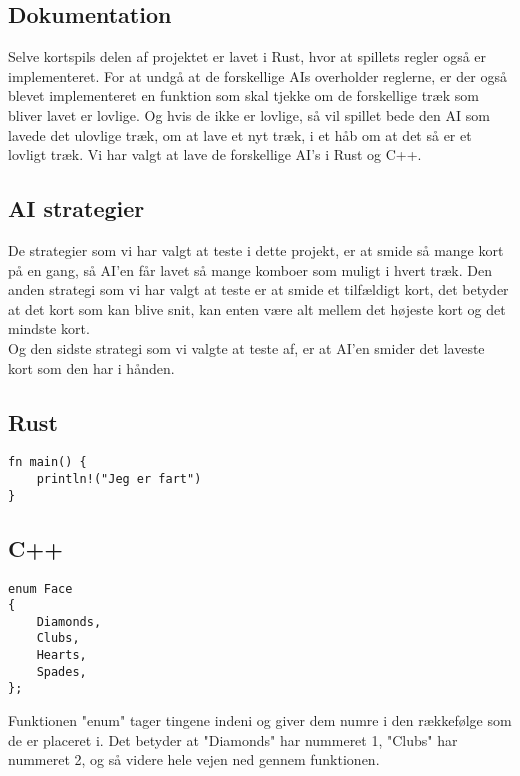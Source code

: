 \documentclass[a4paper, 12pt]{article}
\begin{document}
\begin{multicols}{2}
\vfill

\section{Dokumentation}

Selve kortspils delen af projektet er lavet i Rust, hvor at spillets regler også er implementeret. For at undgå at de forskellige AIs overholder reglerne, er der også blevet implementeret en funktion som skal tjekke om de forskellige træk som bliver lavet er lovlige. Og hvis de ikke er lovlige, så vil spillet bede den AI som lavede det ulovlige træk, om at lave et nyt træk, i et håb om at det så er et lovligt træk. Vi har valgt at lave de forskellige AI's i Rust og C++.

\vfill

\subsection{AI strategier}
De strategier som vi har valgt at teste i dette projekt, er at smide så mange kort på en gang, så AI'en får lavet så mange komboer som muligt i hvert træk. Den anden strategi som vi har valgt at teste er at smide et tilfældigt kort, det betyder at det kort som kan blive snit, kan enten være alt mellem det højeste kort og det mindste kort. \\
Og den sidste strategi som vi valgte at teste af, er at AI'en smider det laveste kort som den har i hånden. 

\vfill
\pagebreak
\end{multicols}

\subsection{Rust}

\begin{verbatim}
fn main() {
	println!("Jeg er fart")
}
\end{verbatim}

\subsection{C++}

\begin{verbatim}
enum Face
{
	Diamonds,
	Clubs,
	Hearts,
	Spades,
};
\end{verbatim}
Funktionen "enum" tager tingene indeni og giver dem numre i den rækkefølge som de er placeret i. Det betyder at "Diamonds" har nummeret 1, "Clubs" har nummeret 2, og så videre hele vejen ned gennem funktionen.
\bigbreak
\end{document}
